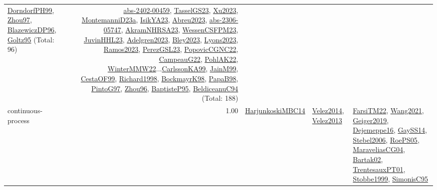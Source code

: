 {\begin{longtable}{p{3cm}r>{\raggedright\arraybackslash}p{6cm}>{\raggedright\arraybackslash}p{6cm}>{\raggedright\arraybackslash}p{8cm}}
\hyperref[detail:DorndorfPH99]{DorndorfPH99}, \hyperref[detail:Zhou97]{Zhou97}, \hyperref[detail:BlazewiczDP96]{BlazewiczDP96}, \hyperref[detail:Goltz95]{Goltz95} (Total: 96) & \hyperref[detail:abs-2402-00459]{abs-2402-00459}, \hyperref[detail:TasselGS23]{TasselGS23}, \hyperref[detail:Xu2023]{Xu2023}, \hyperref[detail:MontemanniD23a]{MontemanniD23a}, \hyperref[detail:IsikYA23]{IsikYA23}, \hyperref[detail:Abreu2023]{Abreu2023}, \hyperref[detail:abs-2306-05747]{abs-2306-05747}, \hyperref[detail:AkramNHRSA23]{AkramNHRSA23}, \hyperref[detail:WessenCSFPM23]{WessenCSFPM23}, \hyperref[detail:JuvinHHL23]{JuvinHHL23}, \hyperref[detail:Adelgren2023]{Adelgren2023}, \hyperref[detail:Bley2023]{Bley2023}, \hyperref[detail:Lyons2023]{Lyons2023}, \hyperref[detail:Ramos2023]{Ramos2023}, \hyperref[detail:PerezGSL23]{PerezGSL23}, \hyperref[detail:PopovicCGNC22]{PopovicCGNC22}, \hyperref[detail:CampeauG22]{CampeauG22}, \hyperref[detail:PohlAK22]{PohlAK22}, \hyperref[detail:WinterMMW22]{WinterMMW22}...\hyperref[detail:CarlssonKA99]{CarlssonKA99}, \hyperref[detail:JainM99]{JainM99}, \hyperref[detail:CestaOF99]{CestaOF99}, \hyperref[detail:Richard1998]{Richard1998}, \hyperref[detail:BockmayrK98]{BockmayrK98}, \hyperref[detail:PapaB98]{PapaB98}, \hyperref[detail:PintoG97]{PintoG97}, \hyperref[detail:Zhou96]{Zhou96}, \hyperref[detail:BaptisteP95]{BaptisteP95}, \hyperref[detail:BeldiceanuC94]{BeldiceanuC94} (Total: 188)\\
\index{continuous-process}\index{Concepts!continuous-process}continuous-process &  1.00 & \hyperref[detail:HarjunkoskiMBC14]{HarjunkoskiMBC14} & \hyperref[detail:Velez2014]{Velez2014}, \hyperref[detail:Velez2013]{Velez2013} & \hyperref[detail:FarsiTM22]{FarsiTM22}, \hyperref[detail:Wang2021]{Wang2021}, \hyperref[detail:Geiger2019]{Geiger2019}, \hyperref[detail:Dejemeppe16]{Dejemeppe16}, \hyperref[detail:GaySS14]{GaySS14}, \hyperref[detail:Stebel2006]{Stebel2006}, \hyperref[detail:RoePS05]{RoePS05}, \hyperref[detail:MaraveliasCG04]{MaraveliasCG04}, \hyperref[detail:Bartak02]{Bartak02}, \hyperref[detail:TrentesauxPT01]{TrentesauxPT01}, \hyperref[detail:Stobbe1999]{Stobbe1999}, \hyperref[detail:SimonisC95]{SimonisC95}\\

\end{longtable}}

